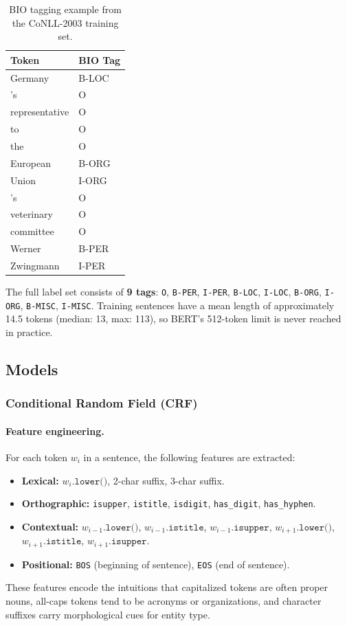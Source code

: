 \documentclass[11pt,a4paper]{article}
\begin{document}
\begin{table}[H]
\centering
\caption{BIO tagging example from the CoNLL-2003 training set.}
\label{tab:q2-bio-example}
\begin{tabular}{ll}
\toprule
\textbf{Token} & \textbf{BIO Tag} \\
\midrule
Germany   & B-LOC \\
's        & O \\
representative & O \\
to        & O \\
the       & O \\
European  & B-ORG \\
Union     & I-ORG \\
's        & O \\
veterinary & O \\
committee & O \\
Werner    & B-PER \\
Zwingmann & I-PER \\
\bottomrule
\end{tabular}
\end{table}

The full label set consists of \textbf{9 tags}: \texttt{O}, \texttt{B-PER},
\texttt{I-PER}, \texttt{B-LOC}, \texttt{I-LOC}, \texttt{B-ORG},
\texttt{I-ORG}, \texttt{B-MISC}, \texttt{I-MISC}. Training sentences have a
mean length of approximately 14.5 tokens (median: 13, max: 113), so BERT's
512-token limit is never reached in practice.

\subsection{Models}

\subsubsection{Conditional Random Field (CRF)}

\paragraph{Feature engineering.}
For each token $w_i$ in a sentence, the following features are extracted:
\begin{itemize}[noitemsep]
    \item \textbf{Lexical:} $w_i.\texttt{lower()}$, 2-char suffix,
    3-char suffix.
    \item \textbf{Orthographic:} \texttt{isupper}, \texttt{istitle},
    \texttt{isdigit}, \texttt{has\_digit}, \texttt{has\_hyphen}.
    \item \textbf{Contextual:} $w_{i-1}.\texttt{lower()}$,
    $w_{i-1}.\texttt{istitle}$, $w_{i-1}.\texttt{isupper}$,
    $w_{i+1}.\texttt{lower()}$, $w_{i+1}.\texttt{istitle}$,
    $w_{i+1}.\texttt{isupper}$.
    \item \textbf{Positional:} \texttt{BOS} (beginning of sentence),
    \texttt{EOS} (end of sentence).
\end{itemize}
These features encode the intuitions that capitalized tokens are often proper
nouns, all-caps tokens tend to be acronyms or organizations, and character
suffixes carry morphological cues for entity type.
\end{document}
